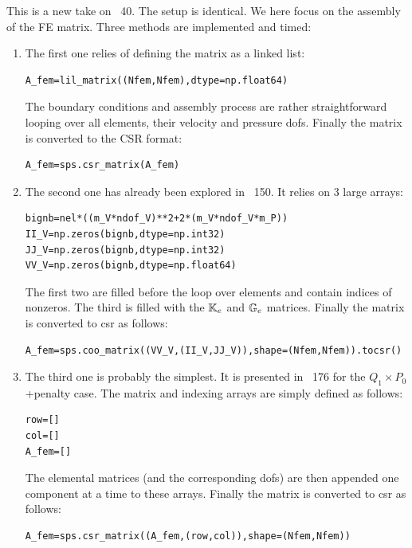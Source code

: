 This \stone is a new take on \stone~40. 
The setup is identical. We here focus on the assembly of the FE matrix. 
Three methods are implemented and timed:
\begin{enumerate}
\item The first one relies of defining the matrix as a linked list:
\begin{lstlisting}
A_fem=lil_matrix((Nfem,Nfem),dtype=np.float64)
\end{lstlisting}
The boundary conditions and assembly process are rather straightforward
looping over all elements, their velocity and pressure dofs.
Finally the matrix is converted to the CSR format:
\begin{lstlisting}
A_fem=sps.csr_matrix(A_fem)
\end{lstlisting}



\item The second one has already been explored in \stone~150.
It relies on 3 large arrays:
\begin{lstlisting}
bignb=nel*((m_V*ndof_V)**2+2*(m_V*ndof_V*m_P))
II_V=np.zeros(bignb,dtype=np.int32)    
JJ_V=np.zeros(bignb,dtype=np.int32)    
VV_V=np.zeros(bignb,dtype=np.float64)    
\end{lstlisting}
The first two are filled before the loop over 
elements and contain indices of nonzeros. 
The third is filled with the ${\mathbb{K}}_e$ and ${\mathbb{G}}_e$ matrices.
Finally the matrix is converted to csr as follows:
\begin{lstlisting}
A_fem=sps.coo_matrix((VV_V,(II_V,JJ_V)),shape=(Nfem,Nfem)).tocsr()
\end{lstlisting}

\item The third one is probably the simplest. It is presented in 
\stone~176 for the $Q_1\times P_0$+penalty case.
The matrix and indexing arrays are simply defined as follows:
\begin{lstlisting}
row=[] 
col=[]
A_fem=[]
\end{lstlisting}
The elemental matrices (and the corresponding dofs) 
are then appended one component at a time to these arrays. 
Finally the matrix is converted to csr as follows:
\begin{lstlisting}
A_fem=sps.csr_matrix((A_fem,(row,col)),shape=(Nfem,Nfem))
\end{lstlisting}
 
\end{enumerate}

